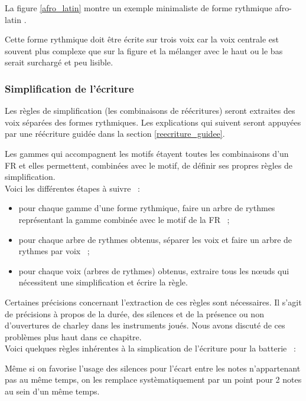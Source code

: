 La figure \ref{afro_latin} montre un exemple minimaliste de
forme rythmique afro-latin \cite{system_drums}.

Cette forme rythmique doit être écrite sur trois voix car la voix
centrale est souvent plus complexe que sur la figure et la mélanger avec le
haut ou le bas serait surchargé et peu lisible.

\subsubsection{Simplification de l’écriture}

Les règles de simplification (les combinaisons de réécritures) seront
extraites des voix séparées des formes rythmiques.
Les explications qui suivent seront appuyées par une réécriture guidée dans la
section \ref{reecriture_guidee}.

Les gammes qui accompagnent les motifs étayent toutes les
combinaisons d’un FR et elles permettent, combinées avec le
motif, de définir ses propres règles de simplification.\\

Voici les différentes étapes à suivre~ :
\begin{itemize}
	\item pour chaque gamme d’une forme rythmique, faire un
        arbre de rythmes représentant la gamme combinée avec le
        motif de la FR~ ;
	\item pour chaque arbre de rythmes obtenus, séparer les voix et faire un
        arbre de rythmes par voix~ ;
	\item pour chaque voix (arbres de rythmes) obtenus, extraire tous les nœuds
        qui nécessitent une simplification et écrire la règle.\\
\end{itemize}

Certaines précisions concernant l’extraction de ces règles sont nécessaires. 
Il s’agit de précisions à propos de la durée, des silences et de la présence ou
non d’ouvertures de charley dans les instruments joués. 
Nous avons discuté de ces problèmes plus haut dans ce chapitre.\\

Voici quelques règles inhérentes à la simplication de l’écriture pour la
batterie~ :

Même si on favorise l’usage des silences pour l’écart entre les notes
n’appartenant pas au même temps, on les remplace systèmatiquement par un point
pour 2 notes au sein d’un même temps.

